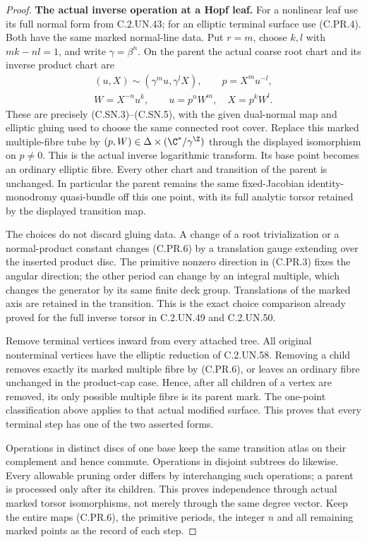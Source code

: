 \begin{proof}
\par\medskip\noindent\textbf{The actual inverse operation at a Hopf leaf.}
For a nonlinear leaf use its full normal form from C.2.UN.43;
for an elliptic terminal surface use (C.PR.4). Both have the
same marked normal-line data. Put $r=m$, choose $k,l$ with
$mk-nl=1$, and write $\gamma=\beta^n$. On the parent the
actual coarse root chart and its inverse product chart are
\[
 \begin{gathered}
 (u,X)\sim(\gamma^m u,\gamma^lX),\qquad p=X^m u^{-l},\\
 W=X^{-n}u^k,\qquad
                u=p^nW^m,\quad X=p^kW^l.
 \end{gathered}                                        \tag{C.PR.6}
\]
These are precisely (C.SN.3)--(C.SN.5), with the given dual-normal
map and elliptic gluing used to choose the same connected root
cover. Replace this marked multiple-fibre tube by
$(p,W)\in\Delta\times(\C^*/\gamma^{\Z})$ through the displayed
isomorphism on $p\ne0$. This is the actual inverse logarithmic
transform. Its base point becomes an ordinary elliptic fibre.
Every other chart and transition of the parent is unchanged.
In particular the parent remains the same fixed-Jacobian
identity-monodromy quasi-bundle off this one point, with its full
analytic torsor retained by the displayed transition map.

The choices do not discard gluing data. A change of a root
trivialization or a normal-product constant changes (C.PR.6) by
a translation gauge extending over the inserted product disc.
The primitive nonzero direction in (C.PR.3) fixes the angular
direction; the other period can change by an integral multiple,
which changes the generator by its same finite deck group.
Translations of the marked axis are retained in the transition.
This is the exact choice comparison already proved for the
full inverse torsor in C.2.UN.49 and C.2.UN.50.

Remove terminal vertices inward from every attached tree.
All original nonterminal vertices have the elliptic reduction
of C.2.UN.58. Removing a child removes exactly its marked
multiple fibre by (C.PR.6), or leaves an ordinary fibre unchanged
in the product-cap case. Hence, after all children of a vertex
are removed, its only possible multiple fibre is its parent
mark. The one-point classification above applies to that
actual modified surface. This proves that every terminal step
has one of the two asserted forms.

Operations in distinct discs of one base keep the same transition
atlas on their complement and hence commute. Operations in disjoint
subtrees do likewise. Every allowable pruning order differs by
interchanging such operations; a parent is processed only after
its children. This proves independence through actual marked
torsor isomorphisms, not merely through the same degree vector.
Keep the entire maps (C.PR.6), the primitive periods, the integer
$n$ and all remaining marked points as the record of each step.


\end{proof}
